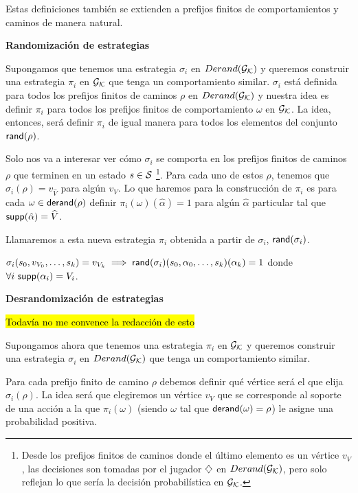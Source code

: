 Estas definiciones también se extienden a prefijos finitos de comportamientos y
caminos de manera natural.

\textbf{Randomización de estrategias}

Supongamos que tenemos una estrategia $\sigma_i$ en $Derand(\mathcal{G}_{\mathcal{K}})$ y queremos construir
una estrategia $\pi_i$ en $\mathcal{G}_{\mathcal{K}}$ que tenga un comportamiento similar. $\sigma_i$
está definida para todos los prefijos finitos de caminos $\rho$ en $Derand(\mathcal{G}_{\mathcal{K}})$ y
nuestra idea es definir $\pi_i$ para todos los prefijos finitos de
comportamiento $\omega$ en $\mathcal{G}_{\mathcal{K}}$. La idea, entonces, será definir $\pi_i$ de
igual manera para todos los elementos del conjunto $\textsf{rand}(\rho)$.

Solo nos va a interesar ver cómo $\sigma_i$ se comporta en los prefijos finitos
de caminos $\rho$ que terminen en un estado $s \in \mathcal{S}$ \footnote{Desde los
	prefijos finitos de caminos donde el último elemento es un vértice $v_V$, las
	decisiones son tomadas por el jugador $\diamondsuit$ en $Derand(\mathcal{G}_{\mathcal{K}})$, pero solo reflejan lo
	que sería la decisión probabilística en $\mathcal{G}_{\mathcal{K}}$.}. Para cada uno de estos $\rho$,
tenemos que $\sigma_i(\rho) = v_{\widehat{V}}$ para algún $v_V$. Lo que haremos
para la construcción de $\pi_i$ es para cada $\omega \in \textsf{derand}(\rho)$ definir
$\pi_i(\omega)(\hat\alpha) = 1$ para algún $\hat\alpha$ particular tal que
$\textsf{supp}(\hat\alpha) = \widehat{V}$.

Llamaremos a esta nueva estrategia $\pi_i$ obtenida a partir de $\sigma_i$,
$\textsf{rand}(\sigma_i)$.

\begin{center}
	$\sigma_i(s_0, v_{V_0}, \dots, s_k) = v_{V_k} \implies \textsf{rand}(\sigma_i)(s_0, \alpha_0, \dots, s_k)(\alpha_k) = 1$ donde \\ $\forall i \ \textsf{supp}(\alpha_i) = V_i$.
\end{center}

\textbf{Desrandomización de estrategias}

\hl{Todavía no me convence la redacción de esto}

Supongamos ahora que tenemos una estrategia $\pi_i$ en $\mathcal{G}_{\mathcal{K}}$ y queremos
construir una estrategia $\sigma_i$ en $Derand(\mathcal{G}_{\mathcal{K}})$ que tenga un comportamiento
similar.

Para cada prefijo finito de camino $\rho$ debemos definir qué vértice será el
que elija $\sigma_i(\rho)$. La idea será que elegiremos un vértice $v_V$ que se
corresponde al soporte de una acción a la que $\pi_i(\omega)$ (siendo $\omega$
tal que $\textsf{derand}(\omega) = \rho$) le asigne una probabilidad positiva.

